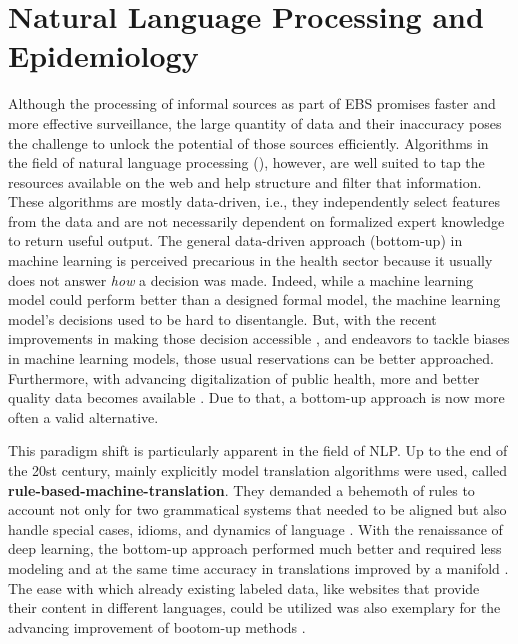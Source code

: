 \section{Natural Language Processing and Epidemiology}
  Although the processing of informal sources as part of EBS promises faster and more effective surveillance, the large quantity of data and their inaccuracy poses the challenge to unlock the potential of those sources efficiently.
  Algorithms in the field of natural language processing (), however, are well suited to tap the resources available on the web and help structure and filter that information.
  These algorithms are mostly data-driven, i.e., they independently select features from the data and are not necessarily dependent on formalized expert knowledge to return useful output.
  The general data-driven approach (bottom-up) in machine learning is perceived precarious in the health sector because it usually does not answer \emph{how} a decision was made.
  Indeed, while a machine learning model could perform better than a designed formal model, the machine learning model's decisions used to be hard to disentangle.
  But, with the recent improvements in making those decision accessible \citep{Arras2017}, and endeavors to tackle biases in machine learning models, those usual reservations can be better approached.
  Furthermore, with advancing digitalization of public health, more and better quality data becomes available \citep{DEMIS}.
  Due to that, a bottom-up approach is now more often a valid alternative.

  This paradigm shift is particularly apparent in the field of NLP.
  Up to the end of the 20st century, mainly explicitly model translation algorithms were used, called \textbf{rule-based-machine-translation}.
  They demanded a behemoth of rules to account not only for two grammatical systems that needed to be aligned but also handle special cases, idioms, and dynamics of language \citep{Bar-Hillel1953, Bar-Hillel1960}.
  With the renaissance of deep learning, the bottom-up approach performed much better and required less modeling and at the same time accuracy in translations improved by a manifold \citep{Bengio2003}.
  The ease with which already existing labeled data, like websites that provide their content in different languages, could be utilized was also exemplary for the advancing improvement of bootom-up methods \citep{Macklovitch00}.


